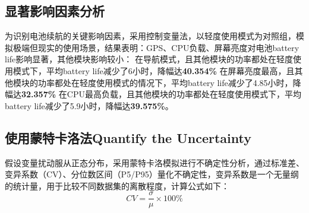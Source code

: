 \documentclass{mcmthesis}  %
\begin{document}
	
	\subsection{显著影响因素分析}
	为识别电池续航的关键影响因素，采用控制变量法，以轻度使用模式为对照组，模拟极端但现实的使用场景，结果表明：GPS、CPU负载、屏幕亮度对电池battery life影响显著，其他模块影响较小：
	在导航模式，且其他模块的功率都处在轻度使用模式下，平均battery life减少了6小时，降幅达\textbf{40.354\%}
	在屏幕亮度最高，且其他模块的功率都处在轻度使用模式的情况下，平均battery life减少了4.85小时，降幅达\textbf{32.357\%}
	在CPU最高负载，且其他模块的功率都处在轻度使用模式下，平均battery life减少了5.9小时，降幅达\textbf{39.575\%}。
	
	
	\subsection{使用蒙特卡洛法Quantify the Uncertainty}
	
	假设变量扰动服从正态分布，采用蒙特卡洛模拟进行不确定性分析，通过标准差、变异系数（CV）、分位数区间（P5/P95）量化不确定性，变异系数是一个无量纲的统计量，用于比较不同数据集的离散程度，计算公式如下：
	\begin{equation}
		CV = \frac{\sigma}{\mu}\times100\%
		\label{eq:cv}
	\end{equation}
	
\end{document}
